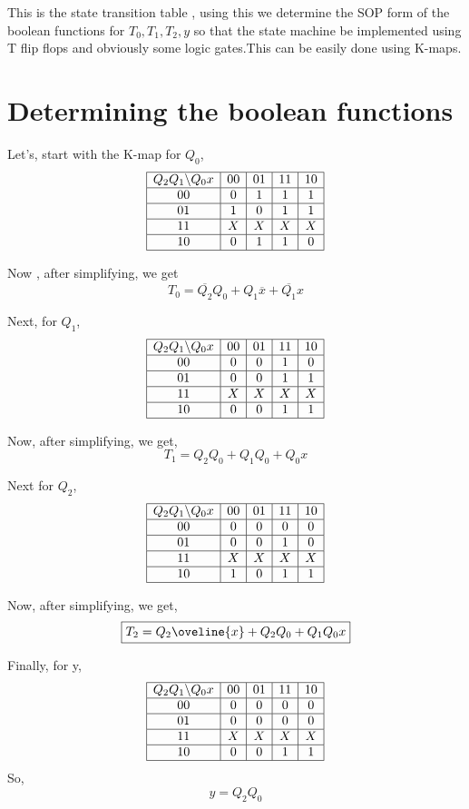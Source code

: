 \documentclass[a4paper,12pt]{article}
\begin{document}
This is the state transition table , using this we determine the SOP form of the boolean functions for $T_0,T_1,T_2,y$ so that the state machine be implemented using T flip flops and obviously some logic gates.This can be easily done using K-maps.

\section{Determining the boolean functions}

Let's, start with the K-map for $Q_0$,
\[
\begin{array}{|c|c|c|c|c|}
\hline
Q_2 Q_1 \backslash Q_0 x & 00 & 01 & 11 & 10 \\
\hline
00 & 0 & 1 & 1 & 1 \\
\hline
01 & 1 & 0 & 1 & 1 \\
\hline
11 & X & X & X & X \\
\hline
10 & 0 & 1 & 1 & 0 \\
\hline
\end{array}
\]

Now , after simplifying, we get
\[
\boxed{T_0 = \overline{Q_2}Q_0 + Q_1 \overline{x} + \overline{Q_1}x} 
\]

Next, for $Q_1$,
\[
\begin{array}{|c|c|c|c|c|}
\hline
Q_2 Q_1 \backslash Q_0 x & 00 & 01 & 11 & 10 \\
\hline
00 & 0 & 0 & 1 & 0 \\
\hline
01 & 0 & 0 & 1 & 1 \\
\hline
11 & X & X & X & X \\
\hline
10 & 0 & 0 & 1 & 1 \\
\hline
\end{array}
\]

Now, after simplifying, we get,
\[
\boxed{T_1 = Q_2Q_0 + Q_1 Q_0 + Q_0x} 
\]

Next for $Q_2$,
\[
\begin{array}{|c|c|c|c|c|}
\hline
Q_2 Q_1 \backslash Q_0 x & 00 & 01 & 11 & 10 \\
\hline
00 & 0 & 0 & 0 & 0 \\
\hline
01 & 0 & 0 & 1 & 0 \\
\hline
11 & X & X & X & X \\
\hline
10 & 1 & 0 & 1 & 1 \\
\hline
\end{array}
\]

Now, after simplifying, we get,
\[
\boxed{T_2 = Q_2\oveline{x} + Q_2Q_0 + Q_1Q_0x}
\]

Finally, for y,
\[
\begin{array}{|c|c|c|c|c|}
\hline
Q_2 Q_1 \backslash Q_0 x & 00 & 01 & 11 & 10 \\
\hline
00 & 0 & 0 & 0 & 0 \\
\hline
01 & 0 & 0 & 0 & 0 \\
\hline
11 & X & X & X & X \\
\hline
10 & 0 & 0 & 1 & 1 \\
\hline
\end{array}
\]
So,
\[
\boxed{y = Q_2Q_0}
\]
\end{document}
